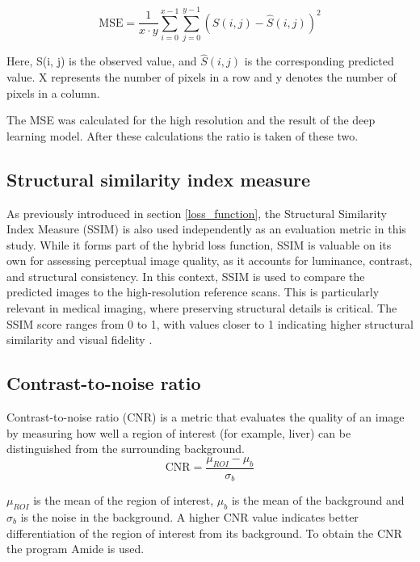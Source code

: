 \documentclass[twocolumn]{article}
\begin{document}
\begin{equation}\label{eq:MSE}
    \text{MSE} = \frac{1}{x \cdot y} \sum_{i=0}^{x-1} \sum_{j=0}^{y-1} \left( S(i, j) - \hat{S}(i, j) \right)^2
\end{equation}

Here, S(i, j) is the observed value, and $\hat{S}(i, j)$  is the corresponding predicted value. 
X represents the number of pixels in a row and y denotes the number of pixels in a column. \cite{mseJim}

The MSE was calculated for the high resolution and the result of the deep learning model. After these calculations the ratio is taken of these two.

\subsection{Structural similarity index measure}

As previously introduced in section \ref{loss_function}, the Structural Similarity Index Measure (SSIM) is also used independently as an evaluation metric in this study.  
While it forms part of the hybrid loss function, SSIM is valuable on its own for assessing perceptual image quality, as it accounts for luminance, contrast, and structural consistency.
In this context, SSIM is used to compare the predicted images to the high-resolution reference scans.  
This is particularly relevant in medical imaging, where preserving structural details is critical.  
The SSIM score ranges from 0 to 1, with values closer to 1 indicating higher structural similarity and visual fidelity \cite{dosselmann-2009}.

\subsection{Contrast-to-noise ratio}
Contrast-to-noise ratio (CNR) is a metric that evaluates the quality of an image by measuring how well a region of interest (for example, liver) can be distinguished from the surrounding background.
\begin{equation}\label{CNR}
\text{CNR}=\frac{\mu_{ROI}-\mu_b}{\sigma_b}
\end{equation}

$\mu_{ROI}$ is the mean of the region of interest, $\mu_b$ is the mean of the background and $\sigma_b$ is the noise in the background.
A higher CNR value indicates better differentiation of the region of interest from its background.
To obtain the CNR the program Amide is used.
\end{document}
